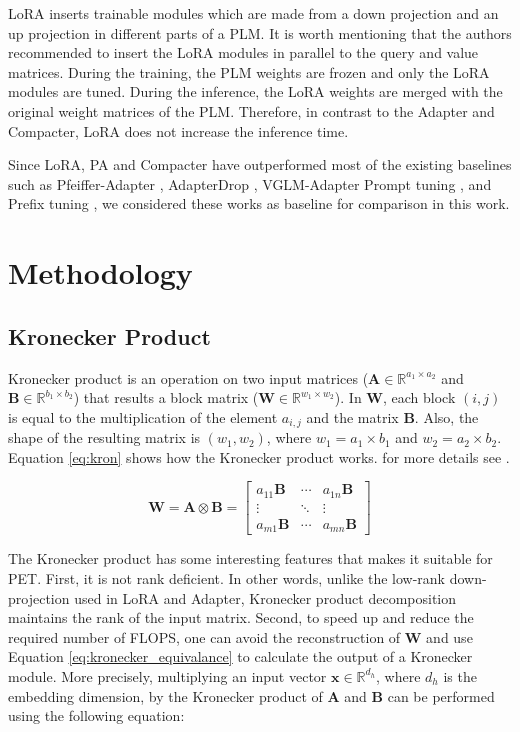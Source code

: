 LoRA \cite{hu2021lora} inserts trainable modules which are made from a down projection and an up projection in different parts of a PLM. It is worth mentioning that the authors recommended to insert the LoRA modules in parallel to the query and value matrices.  During the training, the PLM weights are frozen and only the LoRA modules are tuned. During the inference, the LoRA weights are merged with the original weight matrices of the PLM. Therefore, in contrast to the Adapter and Compacter, LoRA does not increase the inference time. 

Since LoRA, PA and Compacter have outperformed most of the existing baselines such as Pfeiffer-Adapter \cite{pfeiffer2020adapterfusion}, AdapterDrop \cite{ruckle-etal-2021-adapterdrop}, VGLM-Adapter \cite{lin-etal-2020-exploring} Prompt tuning \citep{lester-etal-2021-power}, and Prefix tuning \cite{li-liang-2021-prefix}, we considered these works as baseline for comparison in this work.

\section{Methodology}
\label{sec:meth}
\subsection{Kronecker Product} Kronecker product is an operation on two input matrices ($\mathbf{A} \in \mathbb{R}^{a_1 \times a_2}$ and $\mathbf{B} \in \mathbb{R}^{b_1 \times b_2}$) that results a block matrix ($\mathbf{W} \in \mathbb{R}^{w_1 \times w_2}$). In $\mathbf{W}$, each block $(i, j)$ is equal to the multiplication of the element $a_{i,j}$ and the matrix $\mathbf{B}$. Also, the shape of the resulting matrix is $(w_1, w_2)$, where $w_1 = a_1 \times b_1$ and $w_2 = a_2 \times b_2$. Equation \ref{eq:kron} shows how the Kronecker product works. for more details see  \cite{Henderson1983OnTH}.

\begin{equation}
    \mathbf{W} = \mathbf{A}\otimes\mathbf{B} = \begin{bmatrix}
  a_{11} \mathbf{B} & \cdots & a_{1n}\mathbf{B} \\
             \vdots & \ddots &           \vdots \\
  a_{m1} \mathbf{B} & \cdots & a_{mn} \mathbf{B}
\end{bmatrix}
\label{eq:kron}
\end{equation}

The Kronecker product has some interesting features that makes it suitable for PET. First, it is not rank deficient. In other words, unlike the low-rank down-projection used in LoRA and Adapter, Kronecker product decomposition maintains the rank of the input matrix. Second, to speed up and reduce the required number of FLOPS, one can avoid the reconstruction of $\mathbf{W}$ and use Equation \ref{eq:kronecker_equivalance} to calculate the output of a Kronecker module. More precisely, multiplying an input vector $\mathbf{x} \in \mathbb{R}^{d_h}$, where $d_h$ is the embedding dimension, by the Kronecker product of $\mathbf{A}$ and $\mathbf{B}$ can be performed using the following equation:

